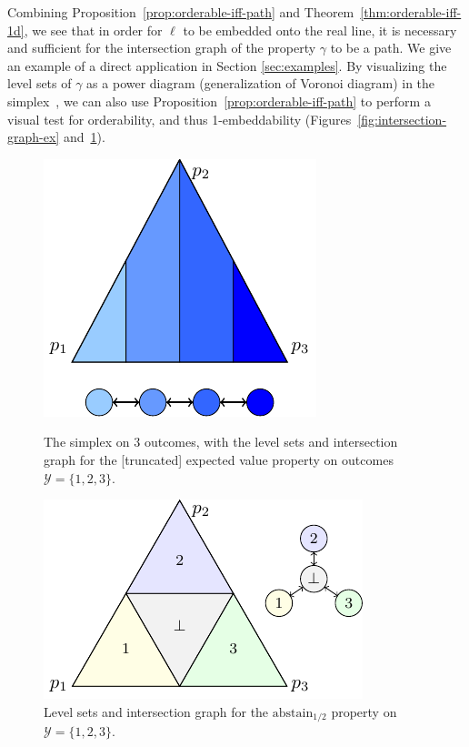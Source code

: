 \documentclass[anon]{colt2020} %
\newcommand{\abstain}[1]{\mathrm{abstain}_{#1}}
\newcommand{\Y}{\mathcal{Y}}
\begin{document}
Combining Proposition~\ref{prop:orderable-iff-path} and Theorem~\ref{thm:orderable-iff-1d}, we see that in order for $\ell$ to be embedded onto the real line, it is necessary and sufficient for the intersection graph of the property $\gamma$ to be a path.
We give an example of a direct application in Section \ref{sec:examples}.
By visualizing the level sets of $\gamma$ as a power diagram (generalization of Voronoi diagram) in the simplex~\cite{lambert2009eliciting}, we can also use Proposition~\ref{prop:orderable-iff-path} to perform a visual test for orderability, and thus 1-embeddability (Figures~\ref{fig:intersection-graph-ex} and~\ref{fig:abstain-alpha-half}).

\begin{figure}
	\begin{minipage}{0.48\linewidth}
	\centering
	\includegraphics[width = 0.8\linewidth]{tikz/intersection-graph.pdf}
	\caption{The simplex on $3$ outcomes, with the level sets and intersection graph for the [truncated] expected value property on outcomes $\Y = \{1,2,3\}$.}
	\label{fig:intersection-graph-ex}
	\end{minipage}
\hfill
	\begin{minipage}{0.48\linewidth}
	\centering
	\includegraphics[width = 0.9\linewidth]{tikz/abstain-alpha-half.pdf}
	\caption{Level sets and intersection graph for the $\abstain{1/2}$ property on $\Y = \{1,2,3\}$.}
	\label{fig:abstain-alpha-half}
\end{minipage}
\end{figure}
\end{document}
